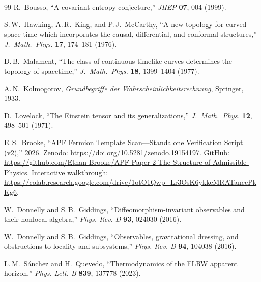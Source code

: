\documentclass[11pt]{article}
\theoremstyle{definition}
\begin{document}
\begin{thebibliography}{99}
R.~Bousso, ``A covariant entropy conjecture,''
\textit{JHEP} \textbf{07}, 004 (1999).

S.\,W.~Hawking, A.\,R.~King, and P.\,J.~McCarthy,
``A new topology for curved space-time which incorporates the causal,
differential, and conformal structures,''
\textit{J.\ Math.\ Phys.} \textbf{17}, 174--181 (1976).

D.\,B.~Malament, ``The class of continuous timelike curves determines
the topology of spacetime,''
\textit{J.\ Math.\ Phys.} \textbf{18}, 1399--1404 (1977).

A.\,N.~Kolmogorov, \textit{Grundbegriffe der Wahrscheinlichkeitsrechnung},
Springer, 1933.

D.~Lovelock, ``The Einstein tensor and its generalizations,''
\textit{J.\ Math.\ Phys.} \textbf{12}, 498--501 (1971).

E.\,S.~Brooke, ``APF Fermion Template Scan---Standalone Verification
Script (v2),'' 2026.
Zenodo: \url{https://doi.org/10.5281/zenodo.19154197}.
GitHub: \url{https://github.com/Ethan-Brooke/APF-Paper-2-The-Structure-of-Admissible-Physics}.
Interactive walkthrough:
\url{https://colab.research.google.com/drive/1otO1Qwp_Lr3OsK6ykkeMRATanecPkKg6}.

W.~Donnelly and S.\,B.~Giddings, ``Diffeomorphism-invariant observables
and their nonlocal algebra,'' \textit{Phys. Rev. D} \textbf{93}, 024030
(2016).

W.~Donnelly and S.\,B.~Giddings, ``Observables, gravitational dressing,
and obstructions to locality and subsystems,'' \textit{Phys. Rev. D}
\textbf{94}, 104038 (2016).

L.\,M.~S\'anchez and H.~Quevedo, ``Thermodynamics of the FLRW apparent
horizon,'' \textit{Phys. Lett. B} \textbf{839}, 137778 (2023).

\end{thebibliography}
\end{document}
